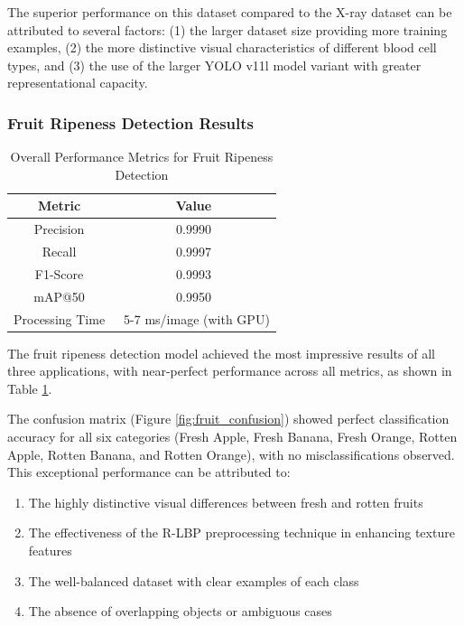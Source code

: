 \begin{multicols}{2}
The superior performance on this dataset compared to the X-ray dataset can be attributed to several factors: (1) the larger dataset size providing more training examples, (2) the more distinctive visual characteristics of different blood cell types, and (3) the use of the larger YOLO v11l model variant with greater representational capacity.
\end{multicols}

\subsubsection{Fruit Ripeness Detection Results}

\begin{table}[ht]
\centering
\begin{tabular}{|c|c|}
\hline
\textbf{Metric} & \textbf{Value} \\
\hline
Precision & 0.9990 \\
Recall & 0.9997 \\
F1-Score & 0.9993 \\
mAP@50 & 0.9950 \\
Processing Time & ~5-7 ms/image (with GPU) \\
\hline
\end{tabular}
\caption{Overall Performance Metrics for Fruit Ripeness Detection}
\label{tab:fruit_results}
\end{table}

\begin{multicols}{2}
The fruit ripeness detection model achieved the most impressive results of all three applications, with near-perfect performance across all metrics, as shown in Table \ref{tab:fruit_results}.

The confusion matrix (Figure \ref{fig:fruit_confusion}) showed perfect classification accuracy for all six categories (Fresh Apple, Fresh Banana, Fresh Orange, Rotten Apple, Rotten Banana, and Rotten Orange), with no misclassifications observed. This exceptional performance can be attributed to:

\begin{enumerate}
    \item The highly distinctive visual differences between fresh and rotten fruits
    \item The effectiveness of the R-LBP preprocessing technique in enhancing texture features
    \item The well-balanced dataset with clear examples of each class
    \item The absence of overlapping objects or ambiguous cases
\end{enumerate}
\end{multicols}

